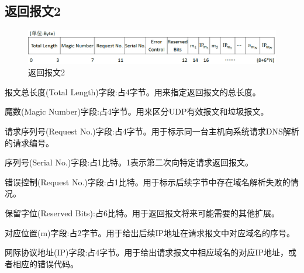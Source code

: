 \subsection{返回报文2}
\begin{figure}[H]
\centering
\includegraphics[keepaspectratio,scale=0.4]{pitures/response2.png}
\caption{返回报文2}
\end{figure}
	\begin{asparaitem}
		\item{报文总长度(Total Length)字段:占4字节。用来指定返回报文的总长度。}
		\item{魔数(Magic Number)字段:占4字节。用来区分UDP有效报文和垃圾报文。}
		\item{请求序列号(Request No.)字段:占4字节。用于标示同一台主机向系统请求DNS解析的请求编号。}
		\item{序列号(Serial No.)字段:占1比特。1表示第二次向特定请求返回报文。}
		\item{错误控制(Request No.)字段:占1比特。用于标示后续字节中存在域名解析失败的情况。}
		\item{保留字位(Reserved Bits):占6比特。用于返回报文将来可能需要的其他扩展。}
		\item{对应位置(m)字段:占2字节。用于给出后续IP地址在请求报文中对应域名的序号。}	
		\item{网际协议地址(IP)字段:占4字节。用于给出请求报文中相应域名的对应IP地址，或者相应的错误代码。}
	\end{asparaitem}

%
